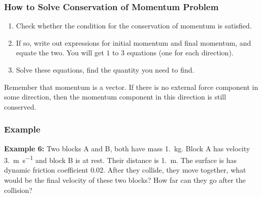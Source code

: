 \documentclass[12pt,compress,aspectratio=169]{beamer}
\begin{document}
\begin{frame}
  \frametitle{How to Solve Conservation of Momentum Problem}
  \begin{enumerate}
  \item Check whether the condition for the conservation of momentum is
    satisfied.
  \item If so, write out expressions for initial momentum and final momentum,
    and equate the two. You will get $1$ to $3$ equations (one for each
    direction).
  \item Solve these equations, find the quantity you need to find.
  \end{enumerate}
%
  Remember that momentum is a vector. If there is no external force component
  in some direction, then the momentum component in this direction is still
  conserved.
\end{frame}

\begin{frame}
  \frametitle{Example}
  \textbf{Example 6:} Two blocks A and B, both have mass \SI{1.}{\kilo\gram}.
  Block A has velocity \SI{3.}{\metre\per\second} and block B is at rest. Their
  distance is \SI{1.}{\metre}. The surface is has dynamic friction coefficient
  $0.02$. After they collide, they move together, what would be the final
  velocity of these two blocks? How far can they go after the collision?
\end{frame}
\end{document}
